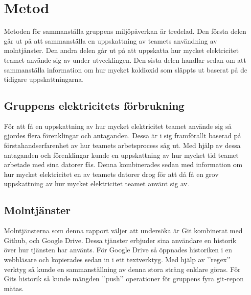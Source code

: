\section{Metod}
\label{sec:joel_a-method}

Metoden för sammanställa gruppens miljöpåverkan är tredelad. Den första delen går ut på att sammanställa en uppskattning av teamets användning av molntjänster. Den andra delen går ut på att uppskatta hur mycket elektricitet teamet använde sig av under utvecklingen. Den sista delen handlar sedan om att sammanställa information om hur mycket koldioxid som släppts ut baserat på de tidigare uppskattningarna. 

\subsection{Gruppens elektricitets förbrukning}
För att få en uppskattning av hur mycket elektricitet teamet använde sig så gjordes flera förenklingar och antaganden. Dessa är i sig framförallt baserad på förstahandserfarenhet av hur teamets arbetsprocess såg ut. Med hjälp av dessa antaganden och förenklingar kunde en uppskattning av hur mycket tid teamet arbetade med sina datorer fås. Denna kombinerades sedan med information om hur mycket elektricitet en av teamets datorer drog för att då få en grov uppskattning av hur mycket elektricitet teamet använt sig av. 

\subsection{Molntjänster}
Molntjänsterna som denna rapport väljer att undersöka är Git kombinerat med Github, och Google Drive. Dessa tjänster erbjuder sina användare en historik över hur tjänsten har använts. För Google Drive så öppnades historiken i en webbläsare och kopierades sedan in i ett textverktyg. Med hjälp av ’’regex’’ verktyg så kunde en sammanställning av denna stora sträng enklare göras. För Gits historik så kunde mängden ’’push’’ operationer för gruppens fyra git-repon mätas.



